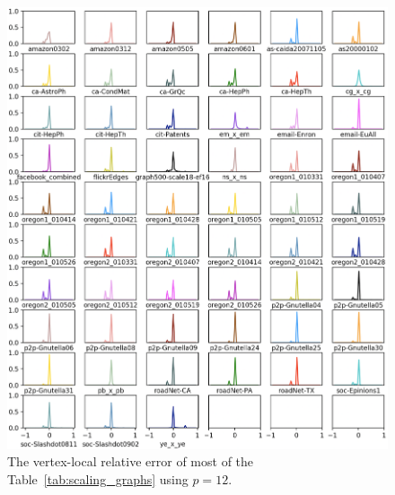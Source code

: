 \documentclass[10]{article}
\begin{document}
\begin{figure}
	\centerline{\includegraphics[width=1.0\columnwidth]{distn_vertex_total}}
	\caption{The vertex-local relative error of most of the  Table~\ref{tab:scaling_graphs} using $p=12$.
	\label{fig:distn_vertex}}
\end{figure}
\end{document}
